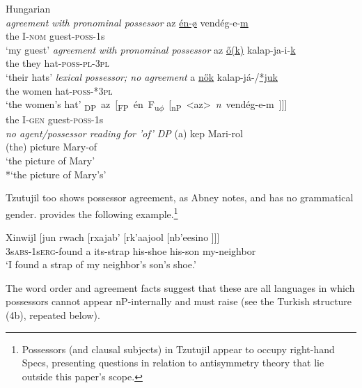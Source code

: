 \documentclass[output=paper
,modfonts
,nonflat]{langsci/langscibook}
\begin{document}
\begin{exe}
	\ex Hungarian \citep[90]{Szabolsci1983}\\
	\xlist
		\ex \textit{agreement with pronominal possessor} \newline
	\gll az   \underline{én-ø} vendég-e-\underline{m}\\
	the I-\textsc{nom} guest-\textsc{poss}{}-1s\\
	\glt `my guest'  	
		\ex \textit{agreement with pronominal possessor} \newline
	\gll az   \underline{\H{o}(k)}  kalap-ja-i-\underline{k}\\
	the they hat-\textsc{poss}{}-\textsc{pl}{}-\textsc{3pl}\\
	\glt `their hats'
		\ex \textit{lexical possessor; no agreement}\newline
	\gll  a   \underline{n\H{o}k}       kalap-já-/\underline{*juk}\\
	the   women hat-\textsc{poss}{}-*\textsc{3pl}\\
	\glt `the women's hat' 
		\ex 
	\gll \mbox{{\lbrack}\textsubscript{DP} az [\textsubscript{FP} én    F\textsubscript{u}\textsubscript{$\phi$} [\textsubscript{nP} <az> \textit{n} vendég-e-m ]]]{\rbrack}}\\
	\hspace{0.6cm}the      \hspace{-5.4cm}I-\textsc{gen}                     \hspace{-2.7cm}guest-\textsc{poss}-1s\\
		\ex \textit{no agent/possessor reading for 'of' DP} \newline
	\gll (a) kep       Mari-rol\\
(the) picture Mary-of\\
	\glt `the picture of Mary'\\ {*}`the picture of Mary's'
	\endxlist
\end{exe}
Tzutujil too shows possessor agreement, as Abney notes, and has no grammatical gender. \citet[286]{Dayley1985} provides the following example.\footnote{Possessors (and clausal subjects) in Tzutujil appear to occupy right-hand Specs, presenting questions in relation to antisymmetry theory \citep{Kayne1994} that lie outside this paper’s scope.} 

\begin{exe}
	\ex 
	\gll Xinwijl [jun rwach [rxajab' [rk'aajool [nb'eesino ]]]{\rbrack}\\
	3s\textsc{abs}-1s\textsc{erg}-found     \hspace{0.1cm}a     its-strap    \hspace{0.1cm}his-shoe      \hspace{0.1cm}his-son    \hspace{0.1cm}my-neighbor\\
	\glt `I found a strap of my neighbor's son's shoe.'  	
\end{exe}
The word order and agreement facts suggest that these are all languages in which possessors cannot appear nP-internally and must raise (see the Turkish structure (4b), repeated below). 
\end{document}
